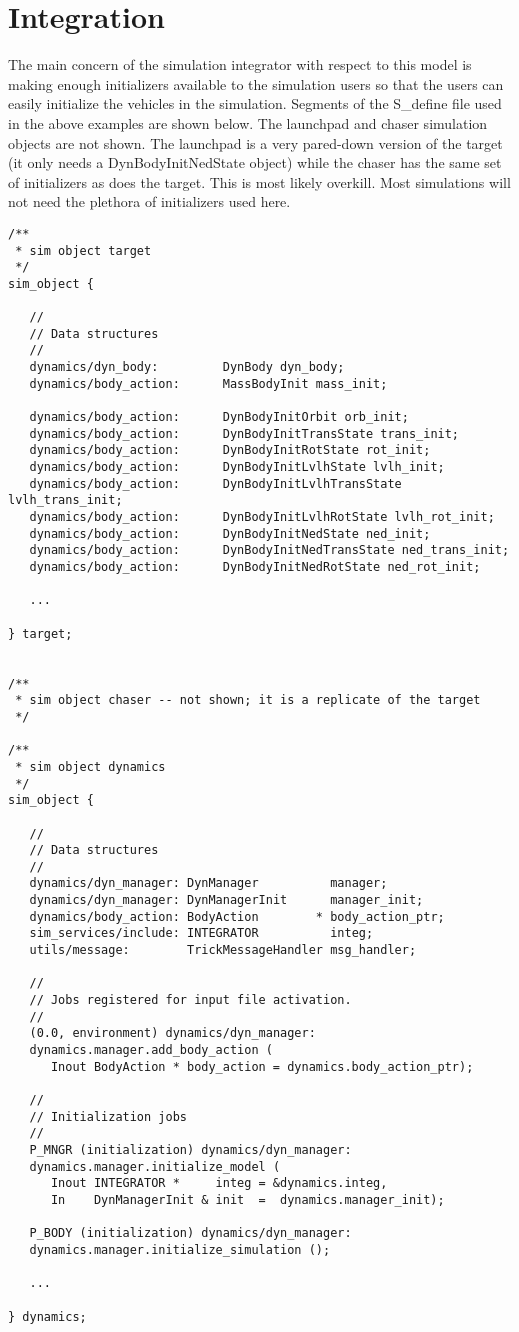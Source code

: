 \section{Integration}

The main concern of the simulation integrator with respect to this
model is making enough initializers available to the simulation users
so that the users can easily initialize the vehicles in the simulation.
Segments of the S\_define file used in the above examples are shown below.
The launchpad and chaser simulation objects are not shown. The launchpad is a
very pared-down version of the target (it only needs a DynBodyInitNedState
object) while the chaser has the same set of initializers as does the target.
This is most likely overkill. Most simulations will not need the plethora
of initializers used here.
\begin{verbatim}
/**
 * sim object target
 */
sim_object {

   //
   // Data structures
   //
   dynamics/dyn_body:         DynBody dyn_body;
   dynamics/body_action:      MassBodyInit mass_init;

   dynamics/body_action:      DynBodyInitOrbit orb_init;
   dynamics/body_action:      DynBodyInitTransState trans_init;
   dynamics/body_action:      DynBodyInitRotState rot_init;
   dynamics/body_action:      DynBodyInitLvlhState lvlh_init;
   dynamics/body_action:      DynBodyInitLvlhTransState lvlh_trans_init;
   dynamics/body_action:      DynBodyInitLvlhRotState lvlh_rot_init;
   dynamics/body_action:      DynBodyInitNedState ned_init;
   dynamics/body_action:      DynBodyInitNedTransState ned_trans_init;
   dynamics/body_action:      DynBodyInitNedRotState ned_rot_init;

   ...

} target;


/**
 * sim object chaser -- not shown; it is a replicate of the target
 */

/**
 * sim object dynamics
 */
sim_object {

   //
   // Data structures
   //
   dynamics/dyn_manager: DynManager          manager;
   dynamics/dyn_manager: DynManagerInit      manager_init;
   dynamics/body_action: BodyAction        * body_action_ptr;
   sim_services/include: INTEGRATOR          integ;
   utils/message:        TrickMessageHandler msg_handler;

   //
   // Jobs registered for input file activation.
   //
   (0.0, environment) dynamics/dyn_manager:
   dynamics.manager.add_body_action (
      Inout BodyAction * body_action = dynamics.body_action_ptr);

   //
   // Initialization jobs
   //
   P_MNGR (initialization) dynamics/dyn_manager:
   dynamics.manager.initialize_model (
      Inout INTEGRATOR *     integ = &dynamics.integ,
      In    DynManagerInit & init  =  dynamics.manager_init);

   P_BODY (initialization) dynamics/dyn_manager:
   dynamics.manager.initialize_simulation ();

   ...

} dynamics;
\end{verbatim}


